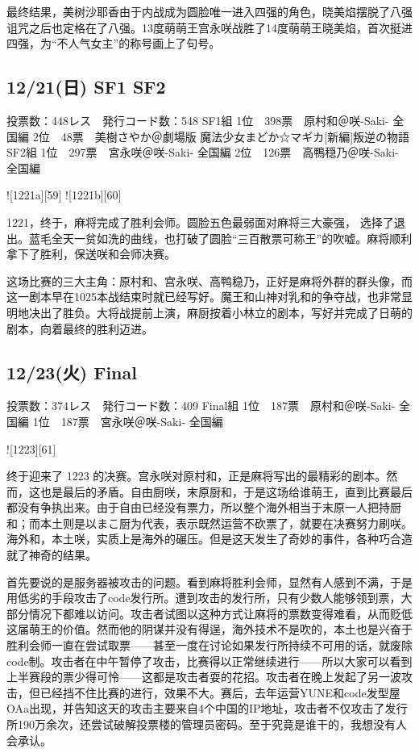最终结果，美树沙耶香由于内战成为圆脸唯一进入四强的角色，晓美焰摆脱了八强诅咒之后也定格在了八强。13度萌萌王宫永咲战胜了14度萌萌王晓美焰，首次挺进四强，为“不人气女主”的称号画上了句号。

\subsection{12/21(日) SF1 SF2}

	投票数：448レス　発行コード数：548
	SF1組
	1位　398票　原村和＠咲-Saki- 全国編
	2位　48票　美樹さやか＠劇場版 魔法少女まどか☆マギカ[新編]叛逆の物語
	SF2組
	1位　297票　宮永咲＠咲-Saki- 全国編
	2位　126票　高鴨穏乃＠咲-Saki- 全国編

![1221a][59]
![1221b][60]

1221，终于，麻将完成了胜利会师。圆脸五色最弱面对麻将三大豪强， 选择了退出。蓝毛全天一贫如洗的曲线，也打破了圆脸“三百散票可称王”的吹嘘。麻将顺利拿下了胜利，保送咲和会师决赛。

这场比赛的三大主角：原村和、宫永咲、高鸭稳乃，正好是麻将外群的群头像，而这一剧本早在1025本战结束时就已经写好。魔王和山神对乳和的争夺战，也非常显明地决出了胜负。大将战提前上演，麻厨按着小林立的剧本，写好并完成了日萌的剧本，向着最终的胜利迈进。

\subsection{12/23(火) Final}

	投票数：374レス　発行コード数：409
	Final組
	1位　187票　原村和＠咲-Saki- 全国編
	1位　187票　宮永咲＠咲-Saki- 全国編

![1223][61]

终于迎来了 1223 的决赛。宫永咲对原村和，正是麻将写出的最精彩的剧本。然而，这也是最后的矛盾。自由厨咲，末原厨和，于是这场给谁萌王，直到比赛最后都没有争执出来。由于自由已经没有票力，所以整个海外相当于末原一人把持厨和；而本土则是以まこ厨为代表，表示既然运营不砍票了，就要在决赛努力刷咲。海外和，本土咲，实质上是海外的碾压。但是这天发生了奇妙的事件，各种巧合造就了神奇的结果。

首先要说的是服务器被攻击的问题。看到麻将胜利会师，显然有人感到不满，于是用低劣的手段攻击了code发行所。遭到攻击的发行所，只有少数人能够领到票，大部分情况下都难以访问。攻击者试图以这种方式让麻将的票数变得难看，从而贬低这届萌王的价值。然而他的阴谋并没有得逞，海外技术不是吹的，本土也是兴奋于胜利会师一直在尝试取票——甚至一度在讨论如果发行所持续不可用的话，就废除code制。攻击者在中午暂停了攻击，比赛得以正常继续进行——所以大家可以看到上半赛段的票少得可怜——这都是攻击者耍的花招。攻击者在晚上发起了另一波攻击，但已经挡不住比赛的进行，效果不大。赛后，去年运营YUNE和code发型屋OAa出现，并告知这天的攻击主要来自4个中国的IP地址，攻击者不仅攻击了发行所190万余次，还尝试破解投票楼的管理员密码。至于究竟是谁干的，我想没有人会承认。

